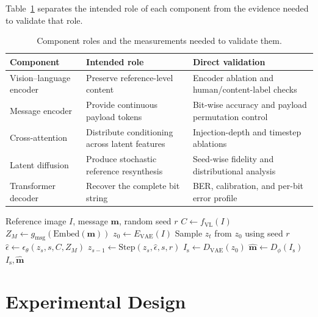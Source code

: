 \documentclass[pdflatex,sn-mathphys-num]{sn-jnl}
\newcommand{\stego}{I_{\mathrm{s}}}
\newcommand{\msg}{\mathbf{m}}
\newcommand{\mhat}{\widehat{\mathbf{m}}}
\begin{document}
Table~\ref{tab:components} separates the intended role of each component from the evidence needed to validate that role.

\begin{table}[t]
\centering
\caption{Component roles and the measurements needed to validate them.}
\label{tab:components}
\footnotesize
\begin{tabularx}{\columnwidth}{p{2.2cm}p{2.5cm}X}
\toprule
\textbf{Component} & \textbf{Intended role} & \textbf{Direct validation} \\
\midrule
Vision--language encoder & Preserve reference-level content & Encoder ablation and human/content-label checks \\
Message encoder & Provide continuous payload tokens & Bit-wise accuracy and payload permutation control \\
Cross-attention & Distribute conditioning across latent features & Injection-depth and timestep ablations \\
Latent diffusion & Produce stochastic reference resynthesis & Seed-wise fidelity and distributional analysis \\
Transformer decoder & Recover the complete bit string & BER, calibration, and per-bit error profile \\
\bottomrule
\end{tabularx}
\end{table}

\begin{algorithm}[t]
\caption{Reference-conditioned message generation and recovery}
\label{alg:semantifusion}
\begin{algorithmic}[1]
\Require Reference image $I$, message $\msg$, random seed $r$
\State $C\gets f_{\mathrm{VL}}(I)$
\State $Z_M\gets g_{\mathrm{msg}}(\mathrm{Embed}(\msg))$
\State $z_0\gets E_{\mathrm{VAE}}(I)$
\State Sample $z_t$ from $z_0$ using seed $r$
  \State $\widehat{\epsilon}\gets\epsilon_{\theta}(z_s,s,C,Z_M)$
  \State $z_{s-1}\gets\mathrm{Step}(z_s,\widehat{\epsilon},s,r)$
\EndFor
\State $\stego\gets D_{\mathrm{VAE}}(z_0)$
\State $\mhat\gets D_{\phi}(\stego)$
\State \Return $\stego,\mhat$
\end{algorithmic}
\end{algorithm}

\section{Experimental Design}
\label{sec:experiment}
\end{document}

